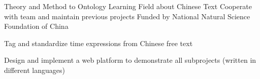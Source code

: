 {Theory and Method to Ontology Learning Field about Chinese Text}
{Cooperate with team and maintain previous projects}
{Funded by National Natural Science Foundation of China}
{}
{
  \begin{tightitemize}
      \item Tag and standardize time expressions from Chinese free text
      \item Design and implement a web platform to demonstrate all subprojects (written in different languages)
  \end{tightitemize}
}
